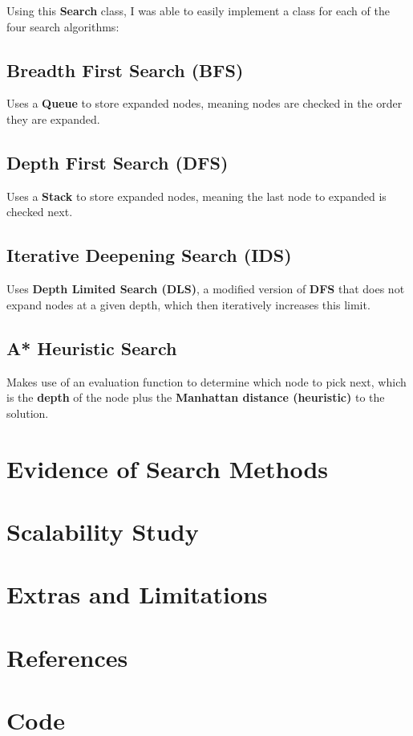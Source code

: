 \documentclass{article}
\begin{document}
	Using this \textbf{Search} class, I was able to easily implement a class for each of the four search algorithms:
	
	\subsection{Breadth First Search (BFS)}
	Uses a \textbf{Queue} to store expanded nodes, meaning nodes are checked in the order they are expanded.
	
	\subsection{Depth First Search (DFS)}
	Uses a \textbf{Stack} to store expanded nodes, meaning the last node to expanded is checked next.
	
	\subsection{Iterative Deepening Search (IDS)}
	Uses \textbf{Depth Limited Search (DLS)}, a modified version of \textbf{DFS} that does not expand nodes at a given depth, which then iteratively increases this limit. 
	
	\subsection{A* Heuristic Search}
	Makes use of an evaluation function to determine which node to pick next, which is the \textbf{depth} of the node plus the \textbf{Manhattan distance (heuristic)} to the solution.
	
	\section{Evidence of Search Methods}
	
	
	\section{Scalability Study}
	\section{Extras and Limitations}
	\section{References}
	\section{Code}
\end{document}
